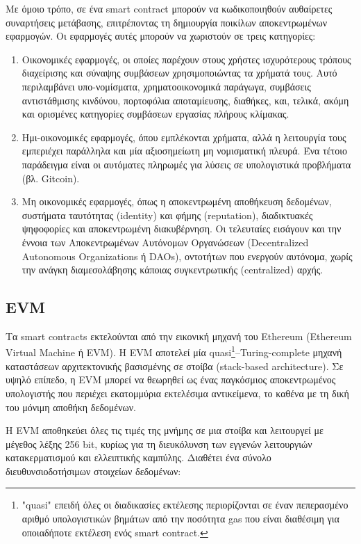 Με όμοιο τρόπο, σε ένα smart contract μπορούν να κωδικοποιηθούν αυθαίρετες συναρτήσεις μετάβασης, επιτρέποντας τη δημιουργία ποικίλων αποκεντρωμένων εφαρμογών. Οι εφαρμογές αυτές μπορούν να χωριστούν σε τρεις κατηγορίες:
\begin{enumerate}
	\item Οικονομικές εφαρμογές, οι οποίες παρέχουν στους χρήστες ισχυρότερους τρόπους διαχείρισης και σύναψης συμβάσεων χρησιμοποιώντας τα χρήματά τους. Αυτό περιλαμβάνει υπο-νομίσματα, χρηματοοικονομικά παράγωγα, συμβάσεις αντιστάθμισης κινδύνου, πορτοφόλια αποταμίευσης, διαθήκες, και, τελικά, ακόμη και ορισμένες κατηγορίες συμβάσεων εργασίας πλήρους κλίμακας.
	
	\item Ημι-οικονομικές εφαρμογές, όπου εμπλέκονται χρήματα, αλλά η λειτουργία τους εμπεριέχει παράλληλα και  μία αξιοσημείωτη μη νομισματική πλευρά. Ένα τέτοιο παράδειγμα είναι οι αυτόματες πληρωμές για λύσεις σε υπολογιστικά προβλήματα (βλ. Gitcoin).
	
	\item Μη οικονομικές εφαρμογές, όπως η αποκεντρωμένη αποθήκευση δεδομένων, συστήματα ταυτότητας (identity) και φήμης (reputation), διαδικτυακές ψηφοφορίες και αποκεντρωμένη διακυβέρνηση. Οι τελευταίες εισάγουν και την έννοια των Αποκεντρωμένων Αυτόνομων Οργανώσεων (Decentralized Autonomous Organizations ή DAOs), οντοτήτων που ενεργούν αυτόνομα, χωρίς την ανάγκη διαμεσολάβησης κάποιας συγκεντρωτικής (\textenglish{centralized}) αρχής.\cite{2.6-ethereum-whitepaper}
\end{enumerate}

\subsection{EVM}
Τα smart contracts εκτελούνται από την εικονική μηχανή του Ethereum (Ethereum Virtual Machine ή EVM). Η EVM αποτελεί μία quasi\footnote{"quasi" επειδή όλες οι διαδικασίες εκτέλεσης περιορίζονται σε έναν πεπερασμένο αριθμό υπολογιστικών βημάτων από την ποσότητα gas που είναι διαθέσιμη για οποιαδήποτε εκτέλεση ενός smart contract.}–Turing-complete μηχανή καταστάσεων αρχιτεκτονικής βασισμένης σε στοίβα (stack-based architecture). Σε υψηλό επίπεδο, η EVM μπορεί να θεωρηθεί ως ένας παγκόσμιος αποκεντρωμένος υπολογιστής που περιέχει εκατομμύρια εκτελέσιμα αντικείμενα, το καθένα με τη δική του μόνιμη αποθήκη δεδομένων.

Η EVM αποθηκεύει όλες τις τιμές της μνήμης σε μια στοίβα και λειτουργεί με μέγεθος λέξης 256 bit, κυρίως για τη διευκόλυνση των εγγενών λειτουργιών κατακερματισμού και ελλειπτικής καμπύλης. Διαθέτει ένα σύνολο διευθυνσιοδοτήσιμων στοιχείων δεδομένων:


